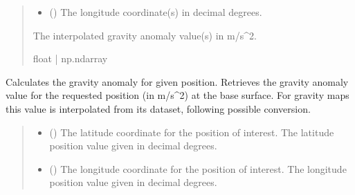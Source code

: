 \documentclass[letterpaper,10pt,english]{sphinxmanual}
\begin{document}
\begin{fulllineitems}
\begin{fulllineitems}
\begin{quote}
\begin{description}
\begin{itemize}
\item {} 
\sphinxAtStartPar
{} (\sphinxstyleliteralemphasis{\sphinxupquote{ | }}) \textendash{} The longitude coordinate(s) in decimal degrees.

\end{itemize}

\sphinxAtStartPar
The interpolated gravity anomaly value(s) in m/s\textasciicircum{}2.

\sphinxAtStartPar
float | np.ndarray

\end{description}\end{quote}

\end{fulllineitems}


\begin{fulllineitems}
\label{\detokenize{modules/gravity/marine:qnav.gravity.marine.MarineGravity.get_anomaly}}
\pysigstartsignatures
{}
\pysigstopsignatures
\sphinxAtStartPar
Calculates the gravity anomaly for given position.
Retrieves the gravity anomaly value for the requested position
(in m/s\textasciicircum{}2) at the base surface. For gravity maps this value is
interpolated from its dataset, following possible conversion.
\begin{quote}\begin{description}
\begin{itemize}
\item {} 
\sphinxAtStartPar
{} () \textendash{} The latitude coordinate for the position of interest.
The latitude position value given in decimal degrees.

\item {} 
\sphinxAtStartPar
{} () \textendash{} The longitude coordinate for the position of interest.
The longitude position value given in decimal degrees.


\end{itemize}
\end{description}
\end{quote}
\end{fulllineitems}
\end{fulllineitems}
\end{document}
